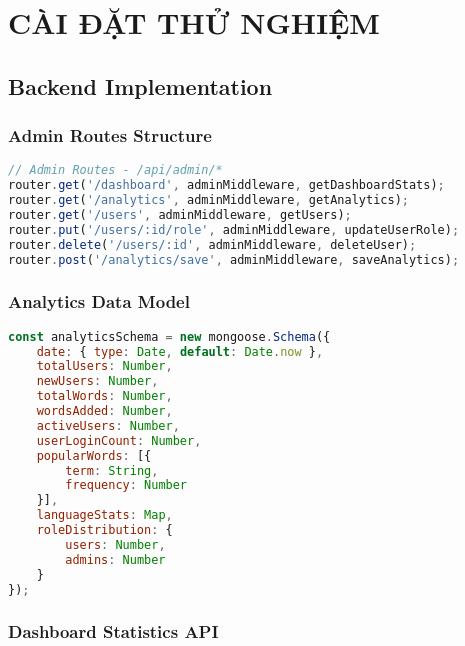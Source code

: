 \documentclass[12pt,a4paper]{article}
\begin{document}
\section{CÀI ĐẶT THỬ NGHIỆM}

\subsection{Backend Implementation}

\subsubsection{Admin Routes Structure}

\begin{lstlisting}[language=JavaScript, caption=Admin API Endpoints]
// Admin Routes - /api/admin/*
router.get('/dashboard', adminMiddleware, getDashboardStats);
router.get('/analytics', adminMiddleware, getAnalytics);
router.get('/users', adminMiddleware, getUsers);
router.put('/users/:id/role', adminMiddleware, updateUserRole);
router.delete('/users/:id', adminMiddleware, deleteUser);
router.post('/analytics/save', adminMiddleware, saveAnalytics);
\end{lstlisting}

\subsubsection{Analytics Data Model}

\begin{lstlisting}[language=JavaScript, caption=Analytics Schema]
const analyticsSchema = new mongoose.Schema({
    date: { type: Date, default: Date.now },
    totalUsers: Number,
    newUsers: Number,
    totalWords: Number,
    wordsAdded: Number,
    activeUsers: Number,
    userLoginCount: Number,
    popularWords: [{
        term: String,
        frequency: Number
    }],
    languageStats: Map,
    roleDistribution: {
        users: Number,
        admins: Number
    }
});
\end{lstlisting}

\subsubsection{Dashboard Statistics API}
\end{document}
